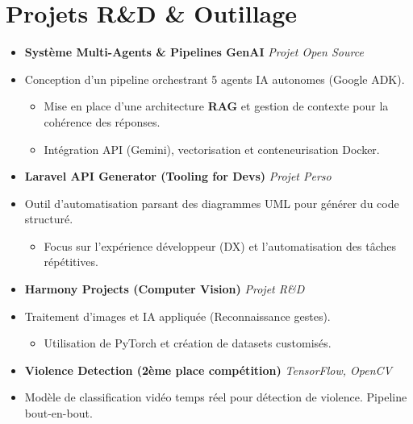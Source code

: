 \documentclass[a4paper,11pt]{article}
\begin{document}
\section{Projets R\&D \& Outillage}
\begin{itemize}[leftmargin=*, label={}]

\item \textbf{Système Multi-Agents & Pipelines GenAI} \hfill \textit{Projet Open Source}
\vspace{-2pt}
\item \small{Conception d'un pipeline orchestrant 5 agents IA autonomes (Google ADK).}
    \begin{itemize}[leftmargin=0.4cm, nosep, label=\tiny$\bullet$]
        \item \small{Mise en place d'une architecture \textbf{RAG} et gestion de contexte pour la cohérence des réponses.}
        \item \small{Intégration API (Gemini), vectorisation et conteneurisation Docker.}
    \end{itemize}
    \vspace{1pt}

\item \textbf{Laravel API Generator (Tooling for Devs)} \hfill \textit{Projet Perso}
\vspace{-2pt}
\item \small{Outil d'automatisation parsant des diagrammes UML pour générer du code structuré.}
    \begin{itemize}[leftmargin=0.4cm, nosep, label=\tiny$\bullet$]
        \item \small{Focus sur l'expérience développeur (DX) et l'automatisation des tâches répétitives.}
    \end{itemize}
    \vspace{1pt}

\item \textbf{Harmony Projects (Computer Vision)} \hfill \textit{Projet R\&D}
\vspace{-2pt}
\item \small{Traitement d'images et IA appliquée (Reconnaissance gestes).}
    \begin{itemize}[leftmargin=0.4cm, nosep, label=\tiny$\bullet$]
        \item \small{Utilisation de PyTorch et création de datasets customisés.}
    \end{itemize}
    \item \textbf{Violence Detection (2ème place compétition)} \hfill \textit{TensorFlow, OpenCV}
    \vspace{-2pt}
    \item \small{Modèle de classification vidéo temps réel pour détection de violence. Pipeline bout-en-bout.}
    \vspace{1pt}


\end{itemize}
\end{document}

